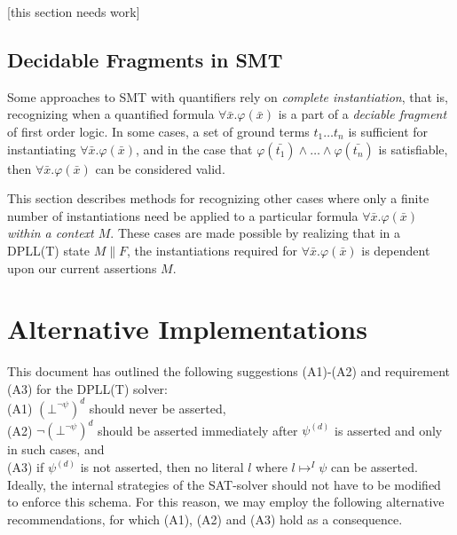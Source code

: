 \documentclass{llncs}
\begin{document}
[this section needs work]

\subsection{Decidable Fragments in SMT}

Some approaches to SMT with quantifiers rely on \emph{complete instantiation}, that is, recognizing when a quantified formula $\forall \bar{ x }. \varphi( \bar{ x } )$ is a part of a \emph{deciable fragment} of first order logic.
In some cases, a set of ground terms $t_1 \ldots t_n$ is sufficient for instantiating $\forall \bar{ x }. \varphi( \bar{ x } )$, and in the case that $\varphi( \bar{ t_1 } ) \wedge \ldots \wedge \varphi( \bar{ t_n } )$ is satisfiable, then $\forall \bar{ x }. \varphi( \bar{ x } )$ can be considered valid.

This section describes methods for recognizing other cases where only a finite number of instantiations need be applied to a particular formula $\forall \bar{ x }. \varphi( \bar{ x } )$ \emph{within a context $M$}.
These cases are made possible by realizing that in a DPLL(T) state $M \parallel F$, the instantiations required for $\forall \bar{ x }. \varphi( \bar{ x } )$ is dependent upon our current assertions $M$.

\section{Alternative Implementations}
\label{sec:implementation}

This document has outlined the following suggestions (A1)-(A2) and requirement (A3) for the DPLL(T) solver: \\

\noindent (A1) $(\bot^{\neg \psi})^d$ should never be asserted, \\
(A2) $\neg (\bot^{\neg \psi})^d$ should be asserted immediately after $\psi^{(d)}$ is asserted and only in such cases, and \\
(A3) if $\psi^{(d)}$ is not asserted, then no literal $l$ where $l \mapsto^I \psi$ can be asserted. \\

Ideally, the internal strategies of the SAT-solver should not have to be modified to enforce this schema.
For this reason, we may employ the following alternative recommendations, for which (A1), (A2) and (A3) hold as a consequence.
\end{document}
